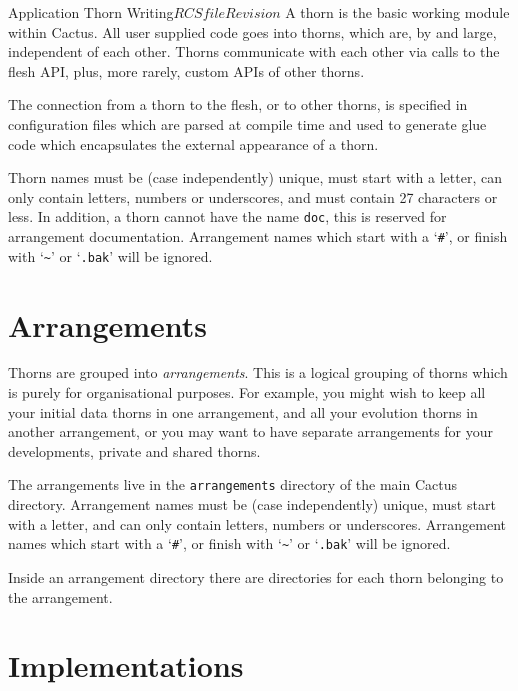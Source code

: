 \begin{cactuspart}{Application Thorn Writing}{$RCSfile$}{$Revision$}
A thorn is the basic working module within Cactus.  All user supplied
code goes into thorns, which are, by and large, independent of each other.
Thorns communicate with each other via calls to the flesh API, plus, more
rarely, custom APIs of other thorns.

The connection from a thorn to the flesh, or to other thorns, is specified in
configuration files which are parsed at compile time and used to generate
glue code which encapsulates the external appearance of a thorn.

Thorn names must be (case independently) unique, must start with a letter,
can only contain
letters, numbers or underscores, and must contain 27 characters or less.
In addition, a thorn cannot have the name \texttt{doc}, this is reserved
for arrangement documentation. Arrangement names which start with a
`\texttt{\#}', or finish with `\texttt{\~{}}' or `\texttt{.bak}' will be
ignored.


\section{Arrangements}
\label{sec:arrangements}

Thorns are grouped into \textit{arrangements}.  This is a logical grouping of
thorns which is purely for organisational purposes. For example,
you might wish to keep all your initial data thorns in one arrangement,
and all your evolution thorns in another arrangement, or you may want
to have separate arrangements for your developments, private and shared
thorns.

The arrangements live in the \texttt{arrangements} directory of the main
Cactus directory.  Arrangement names must be (case independently) unique,
must start with a letter,
and can only contain
letters, numbers or underscores. Arrangement names which start with a
`\texttt{\#}', or finish with `\texttt{\~{}}' or `\texttt{.bak}' will be
ignored.

Inside an arrangement directory there are directories for each thorn
belonging to the arrangement.


\section{Implementations}


\end{cactuspart}
